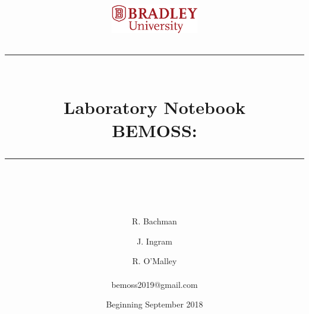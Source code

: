 \documentclass[fontsize=11pt, %
                             paper=letter, %
                             twoside, %
                             captions=tableheading,
                             index=totoc,
                             hyperref]{labbook}
\newcommand{\HRule}{\rule{\linewidth}{0.5mm}} %
\begin{document}


%

\title{
\begin{center}
\href{http://www.bradley.edu}{\includegraphics[height=0.5in]{figs/logoBU1-Print}}
\vskip10pt
\HRule \\[0.4cm]
{\Huge \bfseries Laboratory Notebook \\[0.5cm] \Large BEMOSS: }\\[0.4cm] %
\HRule \\[1.5cm]
\end{center}
}
\author{\Huge R. Bachman \and \Huge J. Ingram  \and \Huge R. O'Malley \\ \\ \LARGE bemoss2019@gmail.com \\[2cm]} %
\date{Beginning September 2018} %
\maketitle


\printindex
\tableofcontents %
\newpage %
\end{document}
